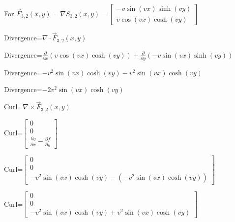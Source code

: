 \documentclass[12pt, executivepaper]{article}
\begin{document}
\begin{flushleft}
\vspace{5mm}

For $\vec F_{3,2}(x,y)=\nabla S_{3,2}(x,y)=
\begin{bmatrix}
-v\sin(vx)\sinh(vy) \\
v\cos(vx)\cosh(vy)
\end{bmatrix}$

\vspace{3mm}

Divergence=$\nabla \cdot \vec F_{3,2}(x,y)$ \\

\vspace{3mm}

Divergence=$\frac{\partial}{\partial x}(v\cos(vx)\cosh(vy))+\frac{\partial}{\partial y}(-v\sin(vx)\sinh(vy))$ \\

\vspace{3mm}

Divergence=$-v^2\sin(vx)\cosh(vy)-v^2\sin(vx)\cosh(vy)$ \\

\vspace{3mm}

Divergence=$-2v^2\sin(vx)\cosh(vy)$ \\

\vspace{3mm}

Curl=$\nabla \times \vec F_{3,2}(x,y)$ \\

\vspace{3mm}

Curl=$\begin{bmatrix}
0 \\
0 \\
\frac{\partial g}{\partial x}-\frac{\partial f}{\partial y}
\end{bmatrix}$ \\

\vspace{3mm}

Curl=$\begin{bmatrix}
0 \\
0 \\
-v^2\sin(vx)\cosh(vy)-(-v^2\sin(vx)\cosh(vy))
\end{bmatrix}$ \\

\vspace{3mm}

Curl=$\begin{bmatrix}
0 \\
0 \\
-v^2\sin(vx)\cosh(vy)+v^2\sin(vx)\cosh(vy)
\end{bmatrix}$ \\


\end{flushleft}
\end{document}
